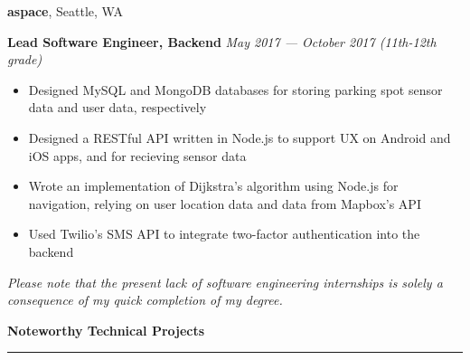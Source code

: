 \documentclass[10pt]{article}
\begin{document}
\begin{flushleft}
		\vspace{-1.50mm}
		\textbf{aspace}, Seattle, WA\\
		\begin{leftli}
			{\small \textbf{Lead Software Engineer, Backend}} \hfill \textit{\small May 2017 --- October 2017 (11th-12th grade)}

			\begin{itemize}
				\item Designed MySQL and MongoDB databases for storing parking spot sensor data and user data, respectively
				\vspace{-2mm}
				\item Designed a RESTful API written in Node.js to support UX on Android and iOS apps, and for recieving sensor data
				\vspace{-2mm}
				\item Wrote an implementation of Dijkstra's algorithm using Node.js for navigation, relying on user location data and data from Mapbox's API
				\vspace{-2mm}
				\item Used Twilio's SMS API to integrate two-factor authentication into the backend
			\end{itemize}
		\end{leftli}

		{\footnotesize \textit{Please note that the present lack of software engineering internships is solely a consequence of my quick completion of my degree.}}

		\vspace{1.25mm}
		{\large \raggedright \textbf{Noteworthy Technical Projects}}
		\vspace{1.25mm}
	
		\hrule
	

\end{flushleft}
\end{document}
